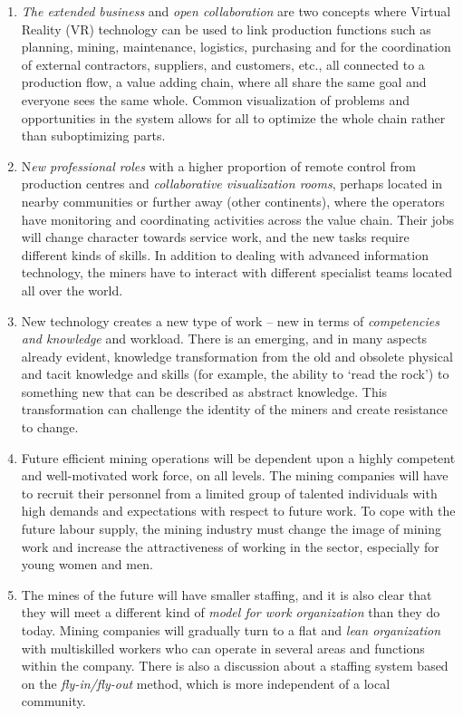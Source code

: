 \documentclass[
  12pt,
]{scrbook}
\begin{document}
\begin{enumerate}
\item
  \emph{The extended business} and \emph{open collaboration} are two concepts where Virtual Reality (VR) technology can be used to link production functions such as planning, mining, maintenance, logistics, purchasing and for the coordination of external contractors, suppliers, and customers, etc., all connected to a production flow, a value adding chain, where all share the same goal and everyone sees the same whole. Common visualization of problems and opportunities in the system allows for all to optimize the whole chain rather than suboptimizing parts.
\item
  N\emph{ew professional roles} with a higher proportion of remote control from production centres and \emph{collaborative visualization rooms}, perhaps located in nearby communities or further away (other continents), where the operators have monitoring and coordinating activities across the value chain. Their jobs will change character towards service work, and the new tasks require different kinds of skills. In addition to dealing with advanced information technology, the miners have to interact with different specialist teams located all over the world.
\item
  New technology creates a new type of work -- new in terms of \emph{competencies and knowledge} and workload. There is an emerging, and in many aspects already evident, knowledge transformation from the old and obsolete physical and tacit knowledge and skills (for example, the ability to `read the rock') to something new that can be described as abstract knowledge. This transformation can challenge the identity of the miners and create resistance to change.
\item
  Future efficient mining operations will be dependent upon a highly competent and well-motivated work force, on all levels. The mining companies will have to recruit their personnel from a limited group of talented individuals with high demands and expectations with respect to future work. To cope with the future labour supply, the mining industry must change the image of mining work and increase the attractiveness of working in the sector, especially for young women and men.
\item
  The mines of the future will have smaller staffing, and it is also clear that they will meet a different kind of \emph{model for work organization} than they do today. Mining companies will gradually turn to a flat and \emph{lean organization} with multiskilled workers who can operate in several areas and functions within the company. There is also a discussion about a staffing system based on the \emph{fly-in/fly-out} method, which is more independent of a local community.
\end{enumerate}
\end{document}
